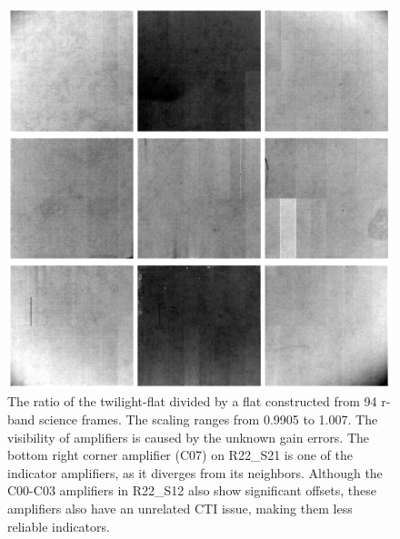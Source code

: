 \begin{figure}
  \begin{center}
  \includegraphics[width=\textwidth]{figures/isr-f06-twilight_flat_ratio.png}
  \caption{The ratio of the twilight-flat divided by a flat constructed from 94 r-band science frames.  The scaling ranges from 0.9905 to 1.007.  The visibility of amplifiers is caused by the unknown gain errors.  The bottom right corner amplifier (C07) on R22\_S21 is one of the indicator amplifiers, as it diverges from its neighbors.  Although the C00-C03 amplifiers in R22\_S12 also show significant offsets, these amplifiers also have an unrelated CTI issue, making them less reliable indicators.}
  \end{center}
\end{figure}

